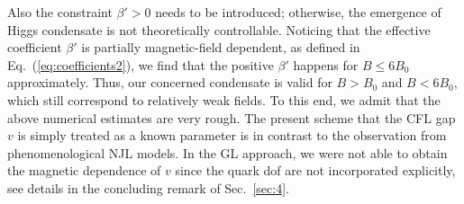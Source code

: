 \documentclass[12pt]{article}
\begin{document}
Also the constraint $\beta'> 0$ needs to be introduced; otherwise, the emergence of Higgs condensate is not
theoretically controllable. Noticing that the effective coefficient $\beta'$ is partially magnetic-field dependent, as defined in Eq.~(\ref{eq:coefficients2}), we find that the positive $\beta'$ happens for $B \leq 6 B_0$ approximately.
Thus, our concerned condensate is valid for $B > B_0$ and $B < 6 B_0$,
which still correspond to relatively weak fields.
To this end, we admit that the above numerical estimates are very rough. The present scheme that the CFL gap $v$ is simply treated as a known parameter is in contrast to the observation from phenomenological NJL models.
In the GL approach, we were not able to obtain the magnetic dependence of $v$ since the quark dof are not incorporated explicitly,  see details in the concluding remark of Sec.~\ref{sec:4}. 

\end{document}
